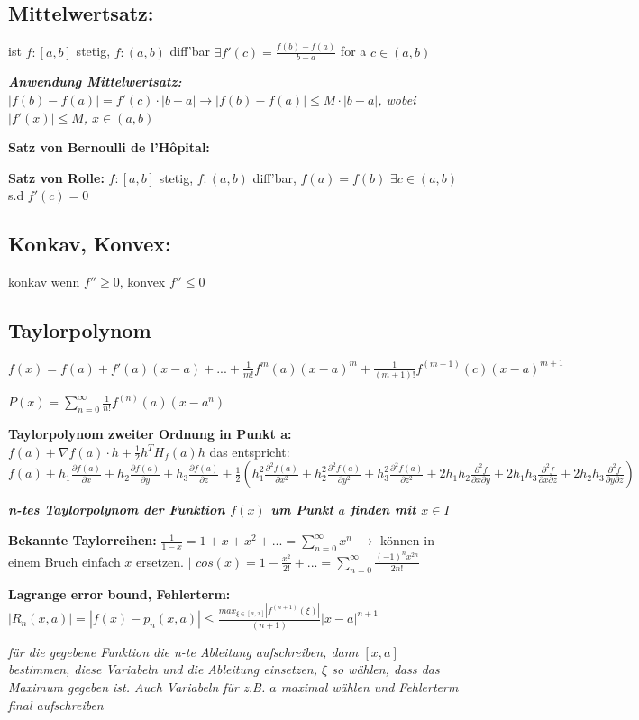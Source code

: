 \documentclass[a3paper, ngerman, 8pt]{article}
\begin{document}
\begin{multicols*}{3}
\subsection*{Mittelwertsatz:} ist $f: [a,b]$ stetig, $f:(a,b)$ diff'bar $\exists f'(c)=\frac{f(b)-f(a)}{b-a}$ for a $c\in (a,b)$

\textit{\textbf{Anwendung Mittelwertsatz:} $|f(b)-f(a)|=f'(c)\cdot |b-a| \to |f(b)-f(a)|\leq M \cdot |b-a|$, wobei $|f'(x)|\leq M $, $x \in (a,b)$}

\textbf{Satz von Bernoulli de l'Hôpital:}

\textbf{Satz von Rolle:} $f: [a,b]$ stetig, $f:(a,b)$ diff'bar, $f(a)=f(b)$ $\exists c \in (a,b)$ s.d $f'(c)=0$

\subsection*{Konkav, Konvex:} konkav wenn $f''\geq0$, konvex $f''\leq 0$

\subsection*{Taylorpolynom}
$f(x)=f(a)+f'(a)(x-a)+...+\frac{1}{m!}f^{m}(a)(x-a)^m+\frac{1}{(m+1)!}f^{(m+1)}(c)(x-a)^{m+1}$

$P(x)=\sum_{n=0}^{\infty}\frac{1}{n!}f^{(n)}(a)(x-a^n)$

\textbf{Taylorpolynom zweiter Ordnung in Punkt a:} $f(a) + \nabla f(a)\cdot h + \frac{1}{2}h^TH_f(a)h$ das entspricht: $f(a) + h_1 \frac{\partial f(a)}{\partial x}+h_2\frac{\partial f(a)}{\partial y}+h_3\frac{\partial f(a)}{\partial z}+\frac{1}{2}(h_1^2\frac{\partial^2 f(a)}{\partial x^2}+h_2^2\frac{\partial^2 f(a)}{\partial y^2}+h_3^2\frac{\partial^2 f(a)}{\partial z^2}+2h_1h_2\frac{\partial ^2 f}{\partial x \partial y}+2h_1h_3\frac{\partial ^2 f}{\partial x \partial z}+2h_2h_3\frac{\partial ^2 f}{\partial y \partial z})$

\textit{\textbf{n-tes Taylorpolynom der Funktion $f(x)$ um Punkt $a$ finden mit $x \in I$}}

\textbf{Bekannte Taylorreihen:} $\frac{1}{1-x}=1+x+x^2+...=\sum_{n=0}^{\infty}x^n$ $\to$ können in einem Bruch einfach $x$ ersetzen. $\big \vert$ $cos(x)=1-\frac{x^2}{2!}+...=\sum_{n=0}^{\infty}\frac{(-1)^n x^{2n}}{2n!}$

\textbf{Lagrange error bound, Fehlerterm:} $|R_n(x,a)| = |f(x)-p_n(x,a)|\leq \frac{max_{\xi \in [a,x]}|f^{{(n+1)}}(\xi)|}{(n+1)\!}|x-a|^{n+1}$

\textit{für die gegebene Funktion die n-te Ableitung aufschreiben, dann $[x, a]$ bestimmen, diese Variabeln und die Ableitung einsetzen, $\xi$ so wählen, dass das Maximum gegeben ist. Auch Variabeln für z.B. $a$ maximal wählen und Fehlerterm final aufschreiben}


\end{multicols*}
\end{document}
